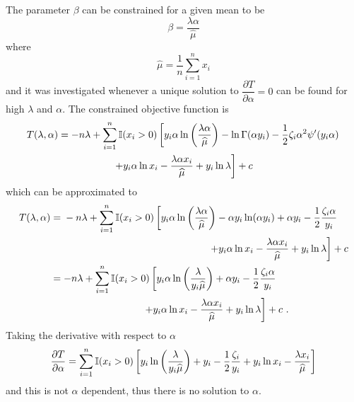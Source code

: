 The parameter $\beta$ can be constrained for a given mean to be
\begin{equation}
  \beta = \frac{\lambda\alpha}{\widehat{\mu}}
  \label{eq:compoundPoisson:beta_restrict}
\end{equation}
where
\begin{equation}
  \widehat{\mu} = \frac{1}{n}\sum_{i=1}^n x_i
\end{equation}
and it was investigated whenever a unique solution to $\dfrac{\partial T}{\partial \alpha} = 0$ can be found for high $\lambda$ and $\alpha$. The constrained objective function is
\begin{multline}
  T(\lambda,\alpha)
  =
  -n\lambda+
  \sum_{i=1}^n
  \mathbb{I}(x_i>0)
  \left[
  y_i\alpha
  \ln\left(\frac{\lambda\alpha}{\widehat{\mu}}\right)-\ln\Gamma(\alpha y_i) - \frac{1}{2}\zeta_i\alpha^2\psi'(y_i\alpha)
  \right.
  \\
  \left.
    +y_i\alpha\ln x_i - \frac{\lambda\alpha x_i}{\widehat{\mu}}
    + y_i \ln \lambda
    \vphantom{\frac{1}{1}}
  \right]
  + c
\end{multline}
which can be approximated to
\begin{align}
  T(\lambda,\alpha)&=
  \begin{multlined}[t]
    -n\lambda+
    \sum_{i=1}^n
    \mathbb{I}(x_i>0)
    \left[
      y_i\alpha\ln\left(\frac{\lambda\alpha}{\widehat{\mu}}\right)-\alpha y_i\ln(\alpha y_i) + \alpha y_i - \frac{1}{2}\frac{\zeta_i\alpha}{y_i}
    \right.
    \\
    \left.
      +y_i\alpha\ln x_i - \frac{\lambda\alpha x_i}{\widehat{\mu}}
      + y_i \ln \lambda
      \vphantom{\frac{1}{1}}
    \right]
    + c
  \end{multlined}
  \nonumber\\
  &\!\begin{multlined}[b]=
    -n\lambda+
    \sum_{i=1}^n
    \mathbb{I}(x_i>0)
    \left[
      y_i\alpha\ln\left(\frac{\lambda}{y_i\widehat{\mu}}\right) + \alpha y_i - \frac{1}{2}\frac{\zeta_i\alpha}{y_i}
    \right.
    {}\\
    \left.
      +y_i\alpha\ln x_i - \frac{\lambda\alpha x_i}{\widehat{\mu}}
      + y_i \ln \lambda
      \vphantom{\frac{1}{1}}
    \right]
    + c
    \ .
  \end{multlined}
\end{align}
Taking the derivative with respect to $\alpha$
\begin{equation}
  \frac{\partial T}{\partial \alpha} =
  \sum_{i=1}^n
  \mathbb{I}(x_i>0)
  \left[
    y_i\ln\left(\frac{\lambda}{y_i\widehat{\mu}}\right)
    + y_i - \frac{1}{2}\frac{\zeta_i}{y_i}
    +y_i\ln x_i - \frac{\lambda x_i}{\widehat{\mu}}
    \vphantom{\frac{1}{1}}
  \right]
\end{equation}
and this is not $\alpha$ dependent, thus there is no solution to $\alpha$.

